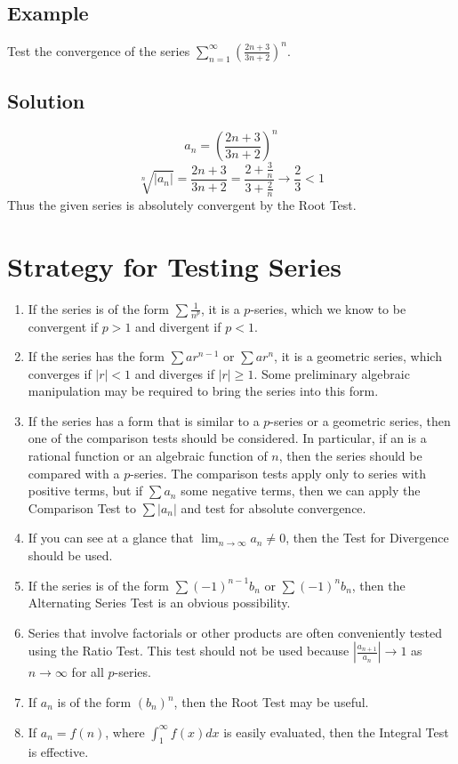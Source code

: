 \subsection*{Example}
Test the convergence of the series $\sum_{n=1}^\infty(\frac{2n+3}{3n+2})^n$.

\subsection*{Solution}
$$a_n=\left(\frac{2n+3}{3n+2}\right)^n$$
$$\sqrt[n]{|a_n|}=\frac{2n+3}{3n+2}=\frac{2+\frac{3}{n}}{3+\frac{2}{n}}\to\frac{2}{3}<1$$
Thus the given series is absolutely convergent by the Root Test.

\section{Strategy for Testing Series}

\begin{enumerate}
    \item If the series is of the form $\sum \frac{1}{n^p}$, it is a $p$-series, which we know to be
          convergent if $p>1$ and divergent if $p<1$.
    \item If the series has the form $\sum ar^{n-1}$ or $\sum ar^n$, it is a geometric series, which
          converges if $|r|<1$ and diverges if $|r| \geq 1$. Some preliminary algebraic manipulation may be required to bring the series into this form.
    \item If the series has a form that is similar to a $p$-series or a geometric series, then one of
          the comparison tests should be considered. In particular, if an is a rational function or an algebraic function of $n$, then the series should be compared with a $p$-series. The comparison tests apply only to series with positive terms, but if $\sum a_n$ some negative terms, then we can apply the Comparison Test to $\sum |a_n|$ and test for absolute convergence.
    \item If you can see at a glance that $\lim_{n \to \infty} a_n \neq 0$, then the Test for Divergence should be used.
    \item If the series is of the form $\sum (-1)^{n-1} b_n$ or $\sum (-1)^n b_n$, then
          the Alternating Series Test is an obvious possibility.
    \item Series that involve factorials or other products are often conveniently tested using the Ratio Test.
          This test should not be used because $|\frac{a_{n+1}}{a_n}| \to 1$ as $n \to \infty$ for all $p$-series.
    \item If $a_n$ is of the form $(b_n)^n$, then the Root Test may be useful.
    \item If $a_n = f(n)$, where $\int_1^\infty f(x) dx$ is easily evaluated, then the Integral Test is effective.
\end{enumerate}

